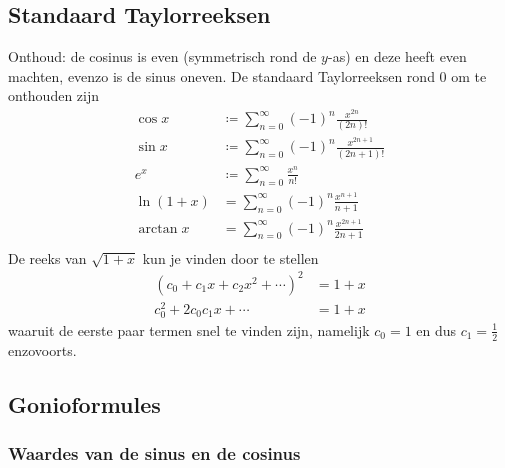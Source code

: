 \subsection{Standaard Taylorreeksen}\label{subsec:standaardTaylorreeksen}
Onthoud: de cosinus is even (symmetrisch rond de $y$-as) en deze heeft even machten, evenzo is de sinus oneven.
De standaard Taylorreeksen rond 0 om te onthouden zijn
\begin{align*}
    \cos x &\coloneqq \sum_{n=0}^\infty (-1)^n \frac{x^{2n}}{(2n)!} \\
    \sin x &\coloneqq \sum_{n=0}^\infty (-1)^n \frac{x^{2n+1}}{(2n+1)!} \\
    e^x &\coloneqq \sum_{n=0}^\infty \frac{x^n}{n!} \\
    \ln (1+x) &= \sum_{n=0}^\infty (-1)^{n} \frac{x^{n+1}}{n+1} \\
    \arctan x &= \sum_{n=0}^\infty (-1)^n \frac{x^{2n+1}}{2n+1} \\
\end{align*}
De reeks van $\sqrt{1+x}$ kun je vinden door te stellen
\begin{align*}
    \left( c_0 + c_1 x + c_2 x^2 + \dotsm \right)^2 &= 1+x \\
    c_0^2 + 2 c_0 c_1 x + \dotsm &= 1+x
\end{align*}
waaruit de eerste paar termen snel te vinden zijn, namelijk $c_0=1$ en dus $c_1 = \frac 1 2$ enzovoorts.
\subsection{Gonioformules} \label{gonioformules}
\subsubsection{Waardes van de sinus en de cosinus}
\begin{figure}[h!]
    \centering
\end{figure}

